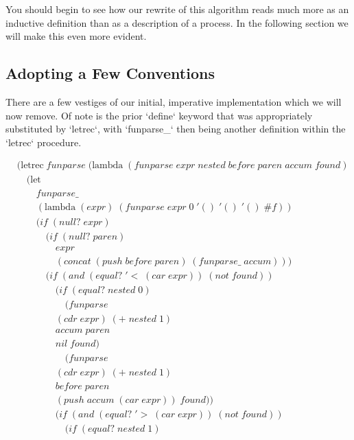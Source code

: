 You should begin to see how our rewrite of this algorithm reads much more as an inductive 
definition than as a description of a process. In the following section we will make this 
even more evident.

\subsection{Adopting a Few Conventions}
There are a few vestiges of our initial, imperative implementation which we will now remove. 
Of note is the prior `define` keyword that was appropriately substituted by `letrec`, with 
`funparse\_` then being another definition within the `letrec` procedure.

\clearpage
\begin{align*}
& (\text{letrec} \; funparse \; (\text{lambda} \; (funparse \; expr \; nested \; before \; paren \; accum \; found) \; 
\\& \quad (\text{let} \; 
\\& \qquad funparse\_ \; 
\\& \qquad (\text{lambda} \; (expr) \; (funparse \; expr \; 0 \; '() \; '() \; '() \; \#f))
\\& \qquad (if \; (null? \; expr)
\\& \qquad \quad (if \; (null? \; paren) \; 
\\& \qquad \qquad expr
\\& \qquad \qquad (concat \; (push \; before \; paren) \; (funparse\_ \; accum)))
\\& \qquad \quad (if \; (and \; (equal? \; '< \; (car \; expr)) \; (not \; found))
\\& \qquad \qquad (if \; (equal? \; nested \; 0)
\\& \qquad \qquad \quad (funparse \; 
\\& \qquad \qquad (cdr \; expr) \; (+ \; nested \; 1) \; 
\\& \qquad \qquad accum \; paren \; 
\\& \qquad \qquad nil \; found)
\\& \qquad \qquad \quad (funparse \; 
\\& \qquad \qquad (cdr \; expr) \; (+ \; nested \; 1) \; 
\\& \qquad \qquad before \; paren \; 
\\& \qquad \qquad (push \; accum \; (car \; expr)) \; found))
\\& \qquad \qquad (if \; (and \; (equal? \; '> \; (car \; expr)) \; (not \; found))
\\& \qquad \qquad \quad (if \; (equal? \; nested \; 1)

\end{align*}
